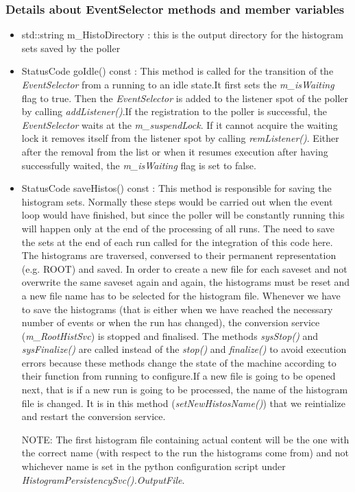 \subsubsection{\textbf{Details about EventSelector methods and member variables}}
\begin{itemize}
\item std::string m\_HistoDirectory : this is the output directory for the histogram sets saved by the poller\par
\item StatusCode goIdle() const : This method is called for the transition of the \textit{EventSelector} from a running to an idle state.It first sets the \textit{m\_isWaiting} flag to true. Then the \textit{EventSelector} is added to the listener spot of the poller by calling \textit{addListener()}.If the registration to the poller is successful, the \textit{EventSelector} waits at the \textit{m\_suspendLock}. If it cannot acquire the waiting lock it removes itself from the listener spot by calling \textit{remListener()}. Either after the removal from the list or when it resumes execution after having successfully waited, the \textit{m\_isWaiting} flag is set to false.\par

\item StatusCode saveHistos() const : This method is responsible for saving the histogram sets. Normally these steps would be carried out when the event loop would have finished, but since the poller will be constantly running this will happen only at the end of the processing of all runs. The need to save the sets at the end of each run called for the integration of this code here. The histograms are traversed, conversed to their permanent representation (e.g. ROOT) and saved. In order to create a new file for each saveset and not overwrite the same saveset again and again, the histograms must be reset and a new file name has to be selected for the histogram file. Whenever we have to save the histograms (that is either when we have reached the necessary number of events or when the run has changed), the conversion service (\textit{m\_RootHistSvc}) is stopped and finalised. The methods \textit{sysStop()} and \textit{sysFinalize()} are called instead of the  \textit{stop()} and \textit{finalize()} to avoid execution errors because these methods change the state of the machine according to their function from running to configure.If a new file is going to be opened next, that is if a new run is going to be processed, the name of the histogram file is changed. It is in this method (\textit{setNewHistosName()}) that we reintialize and restart the conversion service.\par
NOTE: The first histogram file containing actual content will be the one with the correct name (with respect to the run the histograms come from) and not whichever name is set in the python configuration script under \textit{HistogramPersistencySvc().OutputFile}.\par


\end{itemize}


